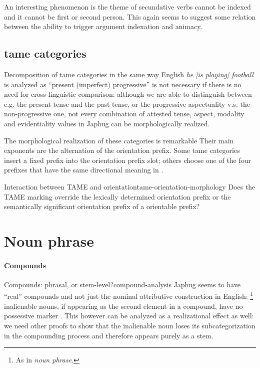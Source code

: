 \documentclass[a4paper, oneside, 12pt]{report}
\newcommand*{\citetable}[1]{Table~{#1}}
\newcommand*{\citepage}[1]{p.~{#1}}
\newcommand{\form}[1]{\emph{#1}}
\begin{document}
An interesting phenomenon is the theme of secundative verbs
cannot be indexed and it cannot be first or second person.
This again seems to suggest some relation between
the ability to trigger argument indexation and animacy.



\subsection{\ac{tame} categories}


Decomposition of \acs{tame} categories 
in the same way English \form{he [is playing] football} 
is analyzed as ``present (imperfect) progressive'' is not necessary
if there is no need for cross-linguistic comparison:
although we are able to distinguish between e.g. the present tense and the past tense,
or the progressive aspectuality v.s. the non-progressive one,
not every combination of attested tense, aspect, modality and evidentiality values in Japhug 
can be morphologically realized.

The morphological realization of these categories is remarkable
Their main exponents are the alternation of the orientation prefix.
Some \acs{tame} categories insert a fixed prefix 
into the orientation prefix slot;
others choose one of the four prefixes that have the same directional meaning 
in \citet[\citetable{15.1}]{jacques2021grammar}. 

\begin{todobox}{Interaction between TAME and orientation}{tame-orientation-morphology}
    Does the TAME marking override the lexically determined orientation prefix 
    or the semantically significant orientation prefix of a orientable prefix?
\end{todobox}

\section{Noun phrase}

\paragraph*{Compounds} 

\begin{todobox}{Compounds: phrasal, or stem-level?}{compound-analysis}
    Japhug seems to have ``real'' compounds and not just
    the nominal attributive construction in English:%
    \footnote{
        As in \form{noun phrase}.
    }
    inalienable nouns, if appearing as the second element in a compound,
    have no possessive marker \citep[\citepage{15}]{jacques2021grammar}. 
    This however can be analyzed as a realizational effect as well:
    we need other proofs to show that the inalienable noun 
    loses its subcategorization in the compounding process
    and therefore appears purely as a stem.
\end{todobox}
\end{document}
